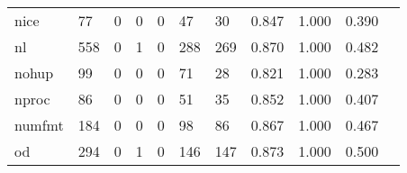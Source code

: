 \begin{longtable}{lp{1.2cm}p{1.2cm}p{1.2cm}p{1.2cm}p{1.2cm}p{1.2cm}p{1.2cm}p{1.2cm}p{1.2cm}p{1.2cm}}
nice      &                                    77 &                                                  0 &                                                  0 &                                                  0 &                                                 47 &                                                 30 &                                         0.847 &                                              1.000 &                                              0.390 \\
nl        &                                   558 &                                                  0 &                                                  1 &                                                  0 &                                                288 &                                                269 &                                         0.870 &                                              1.000 &                                              0.482 \\
nohup     &                                    99 &                                                  0 &                                                  0 &                                                  0 &                                                 71 &                                                 28 &                                         0.821 &                                              1.000 &                                              0.283 \\
nproc     &                                    86 &                                                  0 &                                                  0 &                                                  0 &                                                 51 &                                                 35 &                                         0.852 &                                              1.000 &                                              0.407 \\
numfmt    &                                   184 &                                                  0 &                                                  0 &                                                  0 &                                                 98 &                                                 86 &                                         0.867 &                                              1.000 &                                              0.467 \\
od        &                                   294 &                                                  0 &                                                  1 &                                                  0 &                                                146 &                                                147 &                                         0.873 &                                              1.000 &                                              0.500 \\

\end{longtable}
